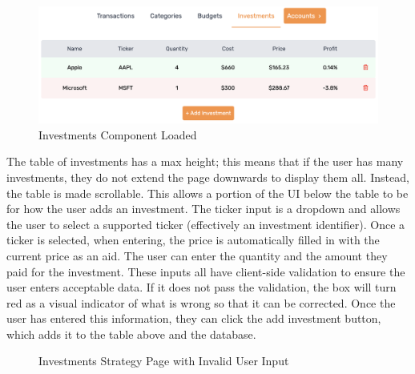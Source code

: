 \begin{figure}[H]
	\centering
	\includegraphics[width=\textwidth]{images/investments_loaded.png}
	\caption{Investments Component Loaded}
	\label{fig:InvestmentsLoaded}
\end{figure}

The table of investments has a max height; this means that if the user has many investments, they do not extend the page downwards to display them all. Instead, the table is made scrollable. This allows a portion of the UI below the table to be for how the user adds an investment. The ticker input is a dropdown and allows the user to select a supported ticker (effectively an investment identifier). Once a ticker is selected, when entering, the price is automatically filled in with the current price as an aid. The user can enter the quantity and the amount they paid for the investment. These inputs all have client-side validation to ensure the user enters acceptable data. If it does not pass the validation, the box will turn red as a visual indicator of what is wrong so that it can be corrected. Once the user has entered this information, they can click the add investment button, which adds it to the table above and the database.

\begin{figure}[H]
	\centering
	\caption{Investments Strategy Page with Invalid User Input}
	\label{fig:InvestmentsError}
\end{figure}

